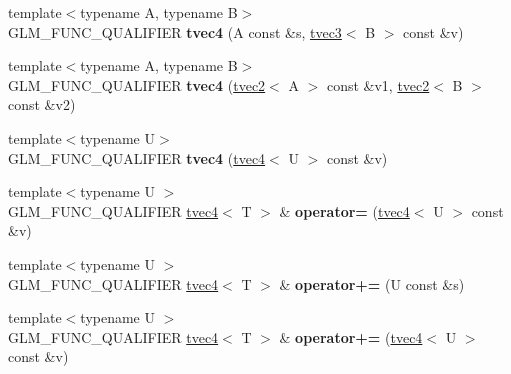\begin{DoxyCompactItemize}
\item 
\hypertarget{structglm_1_1detail_1_1tvec4_ab768b94837de8cd853d4e4f0238556bd}{}{\footnotesize template$<$typename A, typename B$>$ }\\G\+L\+M\+\_\+\+F\+U\+N\+C\+\_\+\+Q\+U\+A\+L\+I\+F\+I\+E\+R {\bfseries tvec4} (A const \&s, \hyperlink{structglm_1_1detail_1_1tvec3}{tvec3}$<$ B $>$ const \&v)\label{structglm_1_1detail_1_1tvec4_ab768b94837de8cd853d4e4f0238556bd}

\item 
\hypertarget{structglm_1_1detail_1_1tvec4_aa6fe58d14fcd72305a7290873d6ebebc}{}{\footnotesize template$<$typename A, typename B$>$ }\\G\+L\+M\+\_\+\+F\+U\+N\+C\+\_\+\+Q\+U\+A\+L\+I\+F\+I\+E\+R {\bfseries tvec4} (\hyperlink{structglm_1_1detail_1_1tvec2}{tvec2}$<$ A $>$ const \&v1, \hyperlink{structglm_1_1detail_1_1tvec2}{tvec2}$<$ B $>$ const \&v2)\label{structglm_1_1detail_1_1tvec4_aa6fe58d14fcd72305a7290873d6ebebc}

\item 
\hypertarget{structglm_1_1detail_1_1tvec4_a36df281e0c88fd525d62f430e3b97313}{}{\footnotesize template$<$typename U$>$ }\\G\+L\+M\+\_\+\+F\+U\+N\+C\+\_\+\+Q\+U\+A\+L\+I\+F\+I\+E\+R {\bfseries tvec4} (\hyperlink{structglm_1_1detail_1_1tvec4}{tvec4}$<$ U $>$ const \&v)\label{structglm_1_1detail_1_1tvec4_a36df281e0c88fd525d62f430e3b97313}

\item 
\hypertarget{structglm_1_1detail_1_1tvec4_a57308ff4746163029ec4410504ef721a}{}{\footnotesize template$<$typename U $>$ }\\G\+L\+M\+\_\+\+F\+U\+N\+C\+\_\+\+Q\+U\+A\+L\+I\+F\+I\+E\+R \hyperlink{structglm_1_1detail_1_1tvec4}{tvec4}$<$ T $>$ \& {\bfseries operator=} (\hyperlink{structglm_1_1detail_1_1tvec4}{tvec4}$<$ U $>$ const \&v)\label{structglm_1_1detail_1_1tvec4_a57308ff4746163029ec4410504ef721a}

\item 
\hypertarget{structglm_1_1detail_1_1tvec4_a47c1d3e36062a1b834f21627a8ee2f23}{}{\footnotesize template$<$typename U $>$ }\\G\+L\+M\+\_\+\+F\+U\+N\+C\+\_\+\+Q\+U\+A\+L\+I\+F\+I\+E\+R \hyperlink{structglm_1_1detail_1_1tvec4}{tvec4}$<$ T $>$ \& {\bfseries operator+=} (U const \&s)\label{structglm_1_1detail_1_1tvec4_a47c1d3e36062a1b834f21627a8ee2f23}

\item 
\hypertarget{structglm_1_1detail_1_1tvec4_a95cdab0975bd4ec8673c96ed10797a4a}{}{\footnotesize template$<$typename U $>$ }\\G\+L\+M\+\_\+\+F\+U\+N\+C\+\_\+\+Q\+U\+A\+L\+I\+F\+I\+E\+R \hyperlink{structglm_1_1detail_1_1tvec4}{tvec4}$<$ T $>$ \& {\bfseries operator+=} (\hyperlink{structglm_1_1detail_1_1tvec4}{tvec4}$<$ U $>$ const \&v)\label{structglm_1_1detail_1_1tvec4_a95cdab0975bd4ec8673c96ed10797a4a}


\end{DoxyCompactItemize}
